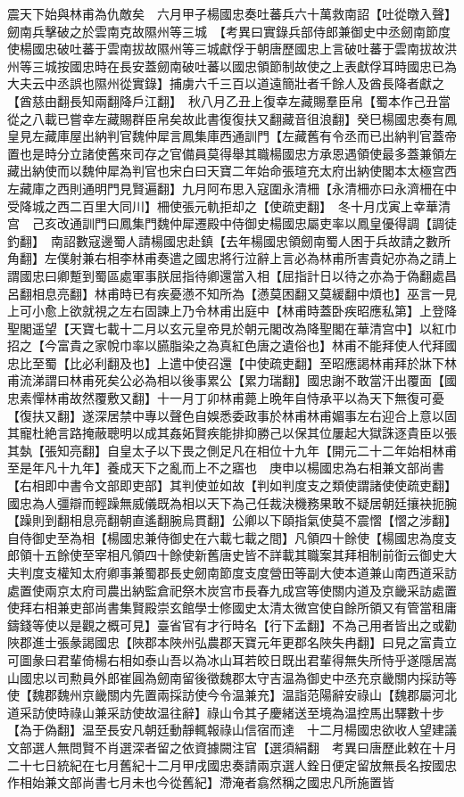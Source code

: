 震天下始與林甫為仇敵矣　六月甲子楊國忠奏吐蕃兵六十萬救南詔【吐從暾入聲】劒南兵擊破之於雲南克故隰州等三城　【考異曰實錄兵部侍郎兼御史中丞劒南節度使楊國忠破吐蕃于雲南拔故隰州等三城獻俘于朝唐歷國忠上言破吐蕃于雲南拔故洪州等三城按國忠時在長安蓋劒南破吐蕃以國忠領節制故使之上表獻俘耳時國忠已為大夫云中丞誤也隰州從實錄】捕虜六千三百以道遠簡壯者千餘人及酋長降者獻之【酋慈由翻長知兩翻降戶江翻】　秋八月乙丑上復幸左藏賜羣臣帛【蜀本作己丑當從之八載已嘗幸左藏賜群臣帛矣故此書復復扶又翻藏音徂浪翻】癸巳楊國忠奏有鳳皇見左藏庫屋出納判官魏仲犀言鳳集庫西通訓門【左藏舊有令丞而已出納判官蓋帝置也是時分立諸使舊來司存之官備員莫得舉其職楊國忠方承恩遇領使最多蓋兼領左藏出納使而以魏仲犀為判官也宋白曰天寶二年始命張瑄充太府出納使閣本太極宫西左藏庫之西則通明門見賢遍翻】九月阿布思入寇圍永清柵【永清柵亦曰永濟柵在中受降城之西二百里大同川】柵使張元軌拒却之【使疏吏翻】　冬十月戊寅上幸華清宫　己亥改通訓門曰鳳集門魏仲犀遷殿中侍御史楊國忠屬吏率以鳳皇優得調【調徒釣翻】　南詔數寇邊蜀人請楊國忠赴鎮【去年楊國忠領劒南蜀人困于兵故請之數所角翻】左僕射兼右相李林甫奏遣之國忠將行泣辭上言必為林甫所害貴妃亦為之請上謂國忠曰卿蹔到蜀區處軍事朕屈指待卿還當入相【屈指計日以待之亦為于偽翻處昌呂翻相息亮翻】林甫時已有疾憂懣不知所為【懣莫困翻又莫緩翻中煩也】巫言一見上可小愈上欲就視之左右固諫上乃令林甫出庭中【林甫時蓋卧疾昭應私第】上登降聖閣遥望【天寶七載十二月以玄元皇帝見於朝元閣改為降聖閣在華清宫中】以紅巾招之【今富貴之家帨巾率以臙脂染之為真紅色唐之遺俗也】林甫不能拜使人代拜國忠比至蜀【比必利翻及也】上遣中使召還【中使疏吏翻】至昭應謁林甫拜於牀下林甫流涕謂曰林甫死矣公必為相以後事累公【累力瑞翻】國忠謝不敢當汗出覆面【國忠素憚林甫故然覆敷又翻】十一月丁卯林甫薨上晩年自恃承平以為天下無復可憂【復扶又翻】遂深居禁中專以聲色自娛悉委政事於林甫林甫媚事左右迎合上意以固其寵杜絶言路掩蔽聰明以成其姦妬賢疾能排抑勝己以保其位屢起大獄誅逐貴臣以張其埶【張知亮翻】自皇太子以下畏之側足凡在相位十九年【開元二十二年始相林甫至是年凡十九年】養成天下之亂而上不之寤也　庚申以楊國忠為右相兼文部尚書【右相即中書令文部即吏部】其判使並如故【判如判度支之類使謂諸使使疏吏翻】國忠為人彊辯而輕躁無威儀既為相以天下為己任裁決機務果敢不疑居朝廷攘袂扼腕【躁則到翻相息亮翻朝直遙翻腕烏貫翻】公卿以下頤指氣使莫不震慴【慴之涉翻】自侍御史至為相【楊國忠兼侍御史在六載七載之間】凡領四十餘使【楊國忠為度支郎領十五餘使至宰相凡領四十餘使新舊唐史皆不詳載其職案其拜相制前衘云御史大夫判度支權知太府卿事兼蜀郡長史劒南節度支度營田等副大使本道兼山南西道采訪處置使兩京太府司農出納監倉祀祭木炭宫市長春九成宫等使關内道及京畿采訪處置使拜右相兼吏部尚書集賢殿崇玄館學士修國史太清太微宫使自餘所領又有管當租庸鑄錢等使以是觀之概可見】臺省官有才行時名【行下孟翻】不為己用者皆出之或勸陜郡進士張彖謁國忠【陜郡本陜州弘農郡天寶元年更郡名陜失冉翻】曰見之富貴立可圖彖曰君輩倚楊右相如泰山吾以為冰山耳若皎日既出君輩得無失所恃乎遂隱居嵩山國忠以司勲員外郎崔圓為劒南留後徵魏郡太守吉温為御史中丞充京畿關内採訪等使【魏郡魏州京畿關内先置兩採訪使今令温兼充】温詣范陽辭安祿山【魏郡屬河北道采訪使時祿山兼采訪使故温往辭】祿山令其子慶緒送至境為温控馬出驛數十步【為于偽翻】温至長安凡朝廷動靜輒報祿山信宿而達　十二月楊國忠欲收人望建議文部選人無問賢不肖選深者留之依資據闕注官【選須絹翻　考異曰唐歷此敕在十月二十七日統紀在七月舊紀十二月甲戌國忠奏請兩京選人銓日便定留放無長名按國忠作相始兼文部尚書七月未也今從舊紀】滯淹者翕然稱之國忠凡所施置皆
